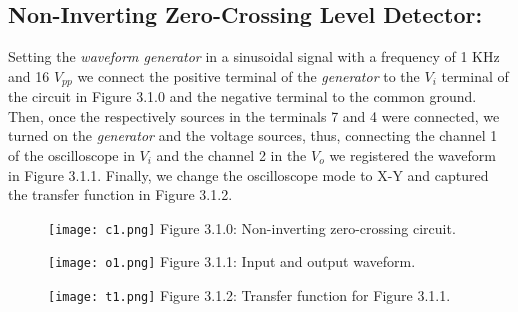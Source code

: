 \subsection{Non-Inverting Zero-Crossing Level Detector:}

Setting the {\itshape waveform generator} in a sinusoidal signal with a frequency of 1 KHz and 16 $V_{pp}$ we connect the positive terminal of the {\itshape generator} to the $V_{i}$ terminal of the circuit in Figure 3.1.0 and the negative terminal to the common ground. Then, once the respectively sources in the terminals 7 and 4 were connected, we turned on the {\itshape generator} and the voltage sources, thus, connecting the channel 1 of the oscilloscope in $V_{i}$ and the channel 2 in the $V_{o}$ we registered the waveform in Figure 3.1.1. Finally, we change the oscilloscope mode to X-Y and captured the transfer function in Figure 3.1.2. \hfill \break

{\bfseries\itshape\color{carmine}{Observation:}} {\itshape{}} \hfill

\begin{figure}[H]
\texttt{[image: c1.png]}
\centering \linebreak \linebreak Figure 3.1.0: Non-inverting zero-crossing circuit.
\end{figure} \hfill

\begin{multicols}{2}
\begin{figure}[H]
\texttt{[image: o1.png]}
\centering \linebreak \linebreak Figure 3.1.1: Input and output waveform.
\end{figure} \hfill

\begin{figure}[H]
\texttt{[image: t1.png]}
\centering \linebreak \linebreak Figure 3.1.2: Transfer function for Figure 3.1.1.
\end{figure} \hfill
\end{multicols} 

{\bfseries\itshape\color{carmine}{Observation:}} {\itshape\color{carmine}{In Figure 3.1.1 we can see two waveform, the yellow one it's the input of the circuit, analogously, the blue it's for the output.}}

\pagebreak